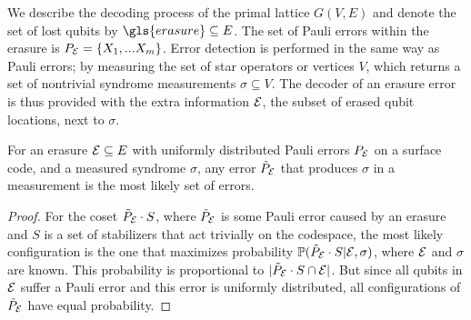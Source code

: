 We describe the decoding process of the primal lattice $G(V,E)$ and denote the set of lost qubits by $\gls{erasure}\subseteq E$. The set of Pauli errors within the erasure is $P_{\mathcal{E}} = \{X_1,...X_m\}$. Error detection is performed in the same way as Pauli errors; by measuring the set of star operators or vertices $V$, which returns a set of nontrivial syndrome measurements $\sigma \subseteq V$. The decoder of an erasure error is thus provided with the extra information $\mathcal{E}$, the subset of erased qubit locations, next to $\sigma$. 
\begin{lemma}\label{lem:peelinguni}
  For an erasure $\mathcal{E} \subseteq E$ with uniformly distributed Pauli errors $P_{\mathcal{E}}$ on a surface code, and a measured syndrome $\sigma$, any error  $\tilde{P}_{\mathcal{E}}$ that produces $\sigma$ in a measurement is the most likely set of errors. 
\end{lemma}
\begin{proof}
  For the coset $\tilde{P}_{\mathcal{E}}\cdot S$, where $\tilde{P}_{\mathcal{E}}$ is some Pauli error caused by an erasure and $S$ is a set of stabilizers that act trivially on the codespace, the most likely configuration is the one that maximizes probability $\mathbb{P}(\tilde{P}_{\mathcal{E}}\cdot S|\mathcal{E},\sigma)$, where $\mathcal{E}$ and $\sigma$ are known. This probability is proportional to $|\tilde{P}_{\mathcal{E}}\cdot S \cap\mathcal{E}|$. But since all qubits in $\mathcal{E}$ suffer a Pauli error and this error is uniformly distributed, all configurations of $\tilde{P}_{\mathcal{E}}$ have equal probability. 
\end{proof}

